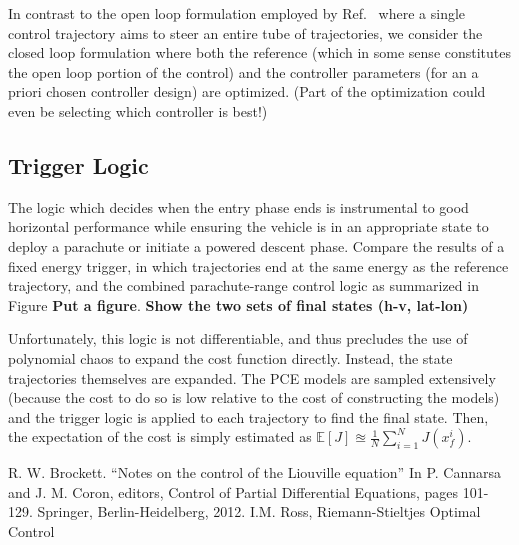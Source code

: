\documentclass[10pt,a4paper]{article}
\begin{document}
	In contrast to the open loop formulation employed by Ref.~\cite{RSOptimalControl} where a single control trajectory aims to steer an entire tube of trajectories, we consider the closed loop formulation where both the reference (which in some sense constitutes the open loop portion of the control) and the controller parameters (for an a priori chosen controller design) are optimized. (Part of the optimization could even be selecting which controller is best!)		
			
	\subsection{Trigger Logic}
	The logic which decides when the entry phase ends is instrumental to good horizontal performance while ensuring the vehicle is in an appropriate state to deploy a parachute or initiate a powered descent phase. Compare the results of a fixed energy trigger, in which trajectories end at the same energy as the reference trajectory, and the combined parachute-range control logic as summarized in Figure \textbf{Put a figure}. \textbf{Show the two sets of final states (h-v, lat-lon)}
	
	Unfortunately, this logic is not differentiable, and thus precludes the use of polynomial chaos to expand the cost function directly. Instead, the state trajectories themselves are expanded. The PCE models are sampled extensively (because the cost to do so is low relative to the cost of constructing the models) and the trigger logic is applied to each trajectory to find the final state. Then, the expectation of the cost is simply estimated as $\mathbb{E}[J]\approxeq\frac{1}{N}\sum_{i=1}^{N}J(x_f^i)$.
			
			
	\begin{thebibliography}{1}
	R. W. Brockett. ``Notes on the control of the Liouville equation'' In P. Cannarsa and J. M.
	Coron, editors, Control of Partial Differential Equations, pages 101-129. Springer,
		Berlin-Heidelberg, 2012.
		I.M. Ross, Riemann-Stieltjes Optimal Control 
	\end{thebibliography}
\end{document}
